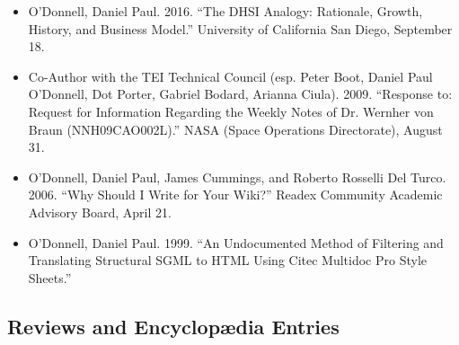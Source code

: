 \documentclass[12pt]{article}
\begin{document}
\begin{itemize}
  \item O’Donnell, Daniel Paul. 2016. “The DHSI Analogy: Rationale, Growth, History, and Business Model.” University of California San Diego, September 18.
  \item Co-Author with the TEI Technical Council (esp. Peter Boot, Daniel Paul O'Donnell, Dot Porter, Gabriel Bodard, Arianna Ciula). 2009. “Response to: Request for Information Regarding the Weekly Notes of Dr. Wernher von Braun (NNH09CAO002L).” NASA (Space Operations Directorate), August 31.
  \item O'Donnell, Daniel Paul, James Cummings, and Roberto Rosselli Del Turco. 2006. “Why Should I Write for Your Wiki?” Readex Community Academic Advisory Board, April 21.
  \item O'Donnell, Daniel Paul. 1999. “An Undocumented Method of Filtering and Translating Structural SGML to HTML Using Citec Multidoc Pro Style Sheets.”
\end{itemize}


\subsection*{Reviews and Encyclopædia Entries}
\end{document}
